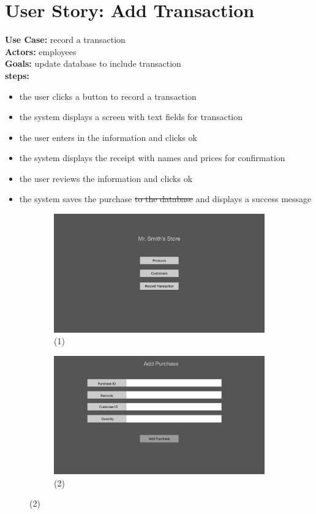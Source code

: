 \documentclass[notitlepage,11pt]{article}
\begin{document}
\section{User Story: Add Transaction}
	\textbf{Use Case:} record a transaction\\
	\textbf{Actors:} employees\\
	\textbf{Goals:} update database to include transaction\\
	\textbf{steps:}
	\begin{itemize}
		\item[(1)] the user clicks a button to record a transaction
		\item[(2)] the system displays a screen with text fields for transaction
		\item the user enters in the information and clicks ok
		\item[(3)] the system displays the receipt with names and prices for confirmation
		\item the user reviews the information and clicks ok
		\item[(4)] the system saves the purchase \sout{to the database} and displays a success message
	\end{itemize}
\begin{figure}[h]
	\begin{subfigure}{.5\textwidth}
	\centering
	\includegraphics[scale=0.12]{MainMenu}
	\caption{(1)}
	\end{subfigure}%
	\begin{subfigure}{.5\textwidth}
	\centering
	\includegraphics[scale=0.12]{AddPurchase}
	\caption{(2)}
	\end{subfigure}
\end{figure}
\end{document}
